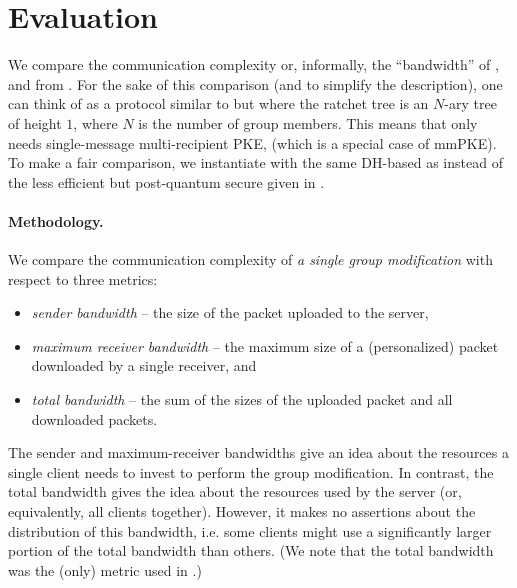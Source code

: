 
\section{Evaluation}\label{sec:eval}
We compare the communication complexity or, informally, the ``bandwidth'' of \saik, \protITK and \protCMPKE from \cite{hashimoto2021cmpke}. For the sake of this comparison (and to simplify the description), one
can think of \protCMPKE as a protocol similar to \saik but where the ratchet tree is an $N$-ary tree of height $1$, where $N$ is the number of group members.
This means that \protCMPKE only needs single-message multi-recipient PKE, \mPKE (which is a special case of mmPKE).
To make a fair comparison, we instantiate \protCMPKE with the same DH-based \mPKE as \saik
instead of the less efficient but post-quantum secure \mPKE
given in \cite{hashimoto2021cmpke}.

\paragraph{Methodology.}
We compare the communication complexity of \emph{a single group modification} with respect to three metrics:
\begin{itemize}
	\item  \emph{sender bandwidth} -- the size of the packet uploaded to the
server,
\item  \emph{maximum receiver bandwidth} -- the maximum size of a (personalized) packet downloaded by a single
receiver, and
\item   \emph{total bandwidth} --  the sum of the sizes of the uploaded packet and all downloaded packets.
\end{itemize}
The sender and maximum-receiver bandwidths give an idea about the resources a single client needs to invest to perform
the group modification. In contrast, the total bandwidth gives the idea about the resources used by the server (or,
equivalently, all clients together). However, it makes no assertions about the distribution of this bandwidth, i.e. some
clients might use a significantly larger portion of the total bandwidth than others. (We note that the total bandwidth was the (only) metric used in \cite{hashimoto2021cmpke}.)

